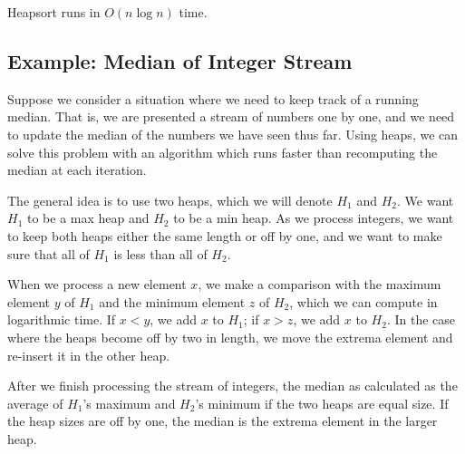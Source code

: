 \documentclass[11pt]{article}
\DeclarePairedDelimiter\floor{\lfloor}{\rfloor}
\begin{document}
\IncMargin{2em}
\begin{algorithm}[H]
    \footnotesize
    \DontPrintSemicolon
    \BlankLine
    \BlankLine \BlankLine
\end{algorithm}\DecMargin{2em} 
Heapsort runs in $O(n \log n)$ time. 

\subsection{Example: Median of Integer Stream}
Suppose we consider a situation where we need to keep track of a running median. That is, we are presented a stream of numbers one by one, and we need to update the median of the numbers we have seen thus far. Using heaps, we can solve this problem with an algorithm which runs faster than recomputing the median at each iteration.

The general idea is to use two heaps, which we will denote $H_1$ and $H_2$. We want $H_1$ to be a max heap and $H_2$ to be a min heap. As we process integers, we want to keep both heaps either the same length or off by one, and we want to make sure that all of $H_1$ is less than all of $H_2$. 

When we process a new element $x$, we make a comparison with the maximum element $y$ of $H_1$ and the minimum element $z$ of $H_2$, which we can compute in logarithmic time. If $x < y$, we add $x$ to $H_1$; if $x > z$, we add $x$ to $H_2$. In the case where the heaps become off by two in length, we move the extrema element and re-insert it in the other heap. 

After we finish processing the stream of integers, the median as calculated as the average of $H_1$'s maximum and $H_2$'s minimum if the two heaps are equal size. If the heap sizes are off by one, the median is the extrema element in the larger heap. 
\end{document}
